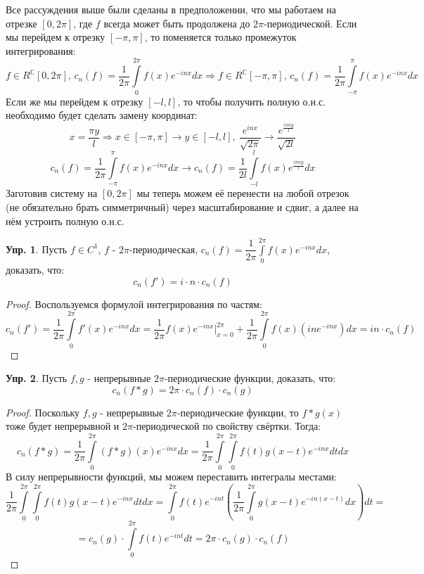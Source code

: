 \documentclass[12pt]{article}
\newcommand{\MC}{\mathbb{C}}
\theoremstyle{definition}
\newtheorem{exrc}{Упр.}
\newcommand{\ddint}[2]{\displaystyle\int\limits_{#1}^{#2}}
\begin{document}
Все рассуждения выше были сделаны в предположении, что мы работаем на отрезке $[0,2\pi]$, где $f$ всегда может быть продолжена до $2\pi$-периодической. Если мы перейдем к отрезку $[-\pi,\pi]$, то поменяется только промежуток интегрирования:
$$
	f \in R^{\MC}[0,2\pi], \, c_n(f) = \dfrac{1}{2\pi}\ddint{0}{2\pi}f(x)e^{-inx}dx 
	\Rightarrow f \in R^{\MC}[-\pi,\pi], \, c_n(f) = \dfrac{1}{2\pi}\ddint{-\pi}{\pi}f(x)e^{-inx}dx 
$$
Если же мы перейдем к отрезку $[-l,l]$, то чтобы получить полную о.н.с. необходимо будет сделать замену координат:
$$
	x = \dfrac{\pi y}{l} \Rightarrow x \in [-\pi,\pi] \to y \in [-l, l], \ \dfrac{e^{inx}}{\sqrt{2\pi}} \to \dfrac{e^{\tfrac{i \pi n y}{l}}}{\sqrt{2l}}
$$
$$	
	c_n(f) = \dfrac{1}{2\pi}\ddint{-\pi}{\pi}f(x)e^{-inx}dx  \to c_n(f) = \dfrac{1}{2l}\ddint{-l}{l}f(x)e^{\tfrac{i \pi n y}{l}}dx 
$$
Заготовив систему на $[0,2\pi]$ мы теперь можем её перенести на любой отрезок (не обязательно брать симметричный) через масштабирование и сдвиг, а далее на нём устроить полную о.н.с. 
\newpage
\begin{exrc}
	Пусть $f \in C^1$, $f$ - $2\pi$-периодическая, $c_n(f) = \dfrac{1}{2\pi}\ddint{0}{2\pi}f(x)e^{-inx}dx$, доказать, что:
	$$
		c_n(f') = i {\cdot}n{\cdot}c_n(f)
	$$
\end{exrc}
\begin{proof}
	Воспользуемся формулой интегрирования по частям:
	$$
		c_n(f') = \dfrac{1}{2\pi}\ddint{0}{2\pi}f'(x)e^{-inx}dx = \dfrac{1}{2\pi}f(x)e^{-inx}\biggl\vert_{x = 0}^{2\pi} + \dfrac{1}{2\pi}\ddint{0}{2\pi}f(x)(ine^{-inx})dx = in{\cdot}c_n(f)
	$$
\end{proof}

\begin{exrc}
	Пусть $f,g$ - непрерывные $2\pi$-периодические функции, доказать, что:
	$$
		c_n(f*g) = 2\pi{\cdot} c_n(f){\cdot}c_n(g)
	$$
\end{exrc}
\begin{proof}
	Поскольку $f,g$ - непрерывные $2\pi$-периодические функции, то $f*g(x)$ тоже будет непрерывной и $2\pi$-периодической по свойству свёртки. Тогда:
	$$
		c_n(f*g) = \dfrac{1}{2\pi}\ddint{0}{2\pi}(f*g)(x)e^{-inx}dx = \dfrac{1}{2\pi}\ddint{0}{2\pi}\ddint{0}{2\pi}f(t)g(x-t) e^{-inx}dt dx
	$$
	В силу непрерывности функций, мы можем переставить интегралы местами:
	$$
		\dfrac{1}{2\pi}\ddint{0}{2\pi}\ddint{0}{2\pi}f(t)g(x-t) e^{-inx}dt dx = \ddint{0}{2\pi}f(t)e^{-int}\left(\dfrac{1}{2\pi}\ddint{0}{2\pi}g(x-t) e^{-in(x -t)}dx\right) dt =  
	$$
	$$
		= c_n(g){\cdot}\ddint{0}{2\pi}f(t)e^{-int}dt = 2\pi{\cdot}c_n(g){\cdot}c_n(f)
	$$
\end{proof}
\end{document}
